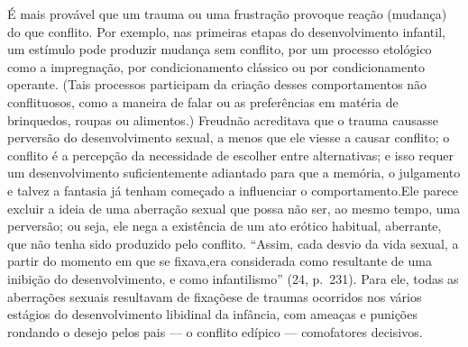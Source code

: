  É mais provável que um trauma ou uma frustração provoque reação
(mudança) do que conflito. Por exemplo, nas primeiras etapas do
desenvolvimento infantil, um estímulo pode produzir mudança sem
conflito, por um processo etológico como a impregnação,\idxestam{} por
condicionamento\idxcond{} clássico ou por condicionamento operante. (Tais
processos participam da criação desses comportamentos não conflituosos,
como a maneira de falar ou as preferências em matéria de brinquedos,
roupas ou alimentos.) Freud\idxfreudperve[|(] não acreditava que o trauma causasse
perversão do desenvolvimento sexual, a menos que ele viesse a causar
conflito; o conflito é a percepção da necessidade de escolher entre
alternativas; e isso requer um desenvolvimento suficientemente
adiantado para que a memória, o julgamento e talvez a fantasia já
tenham começado a influenciar o comportamento.\idxaberr[|(] Ele parece excluir a
ideia de uma aberração sexual que possa não ser, ao mesmo tempo, uma
perversão; ou seja, ele nega a existência de um ato erótico habitual,
aberrante, que não tenha sido produzido pelo conflito. ``Assim, cada
desvio da vida sexual, a partir do momento em que se fixava,\idxaberrfixa[|(] era
considerada como resultante de uma inibição do desenvolvimento, e como
infantilismo'' (24, p.~231). Para ele, todas as aberrações
sexuais resultavam de fixações\idxlibidfixa[|(] e de traumas ocorridos nos vários
estágios do desenvolvimento libidinal da infância, com ameaças e
punições rondando o desejo pelos pais --- o conflito edípico --- como\idxtrauma[|)]
fatores decisivos.


